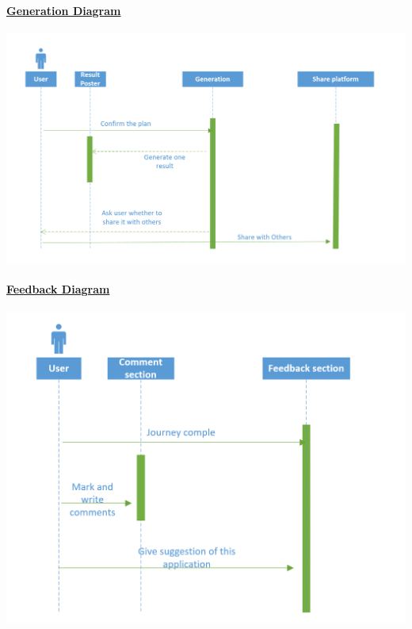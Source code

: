 \documentclass[10pt]{article}
\begin{document}
	\paragraph{\underline{Generation Diagram}}
	\begin{center}
	
		\includegraphics[width=14cm]{6.png} 
	\end{center}

	\paragraph{\underline{Feedback Diagram}}
	\begin{center}
	
		\includegraphics[width=14cm]{7.png} 
	\end{center}
\end{document}
